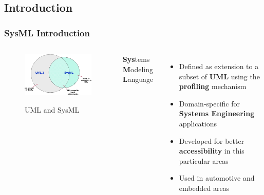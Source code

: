 \documentclass[10pt]{beamer}
\begin{document}
\subsection{Introduction}
\begin{frame}
\frametitle{SysML Introduction}
 \begin{columns}
\begin{center}
\begin{figure}%
\includegraphics[scale=0.3]{sysml_uml_relation}\\
\caption{UML and SysML \cite{OMGSysML}}
\end{figure}
\end{center}   
\textbf{Sys}tems \textbf{M}odeling \textbf{L}anguage
\begin{itemize}
  \item Defined as extension to a subset of \textbf{UML} using the
  \textbf{profiling} mechanism
  \item Domain-specific for \textbf{Systems Engineering} applications
  \item Developed for better \textbf{accessibility} in this particular areas
  \item Used in automotive and embedded areas 
\end{itemize}
\end{columns}
\end{frame}
\end{document}
